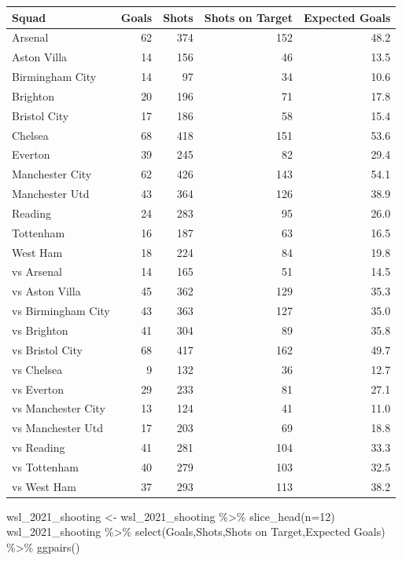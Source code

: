 \documentclass[
  11pt,
]{book}
\newenvironment{Shaded}{\begin{snugshade}}{\end{snugshade}}
\newcommand{\AttributeTok}[1]{\textcolor[rgb]{0.77,0.63,0.00}{#1}}
\newcommand{\DecValTok}[1]{\textcolor[rgb]{0.00,0.00,0.81}{#1}}
\newcommand{\FunctionTok}[1]{\textcolor[rgb]{0.00,0.00,0.00}{#1}}
\newcommand{\NormalTok}[1]{#1}
\newcommand{\OtherTok}[1]{\textcolor[rgb]{0.56,0.35,0.01}{#1}}
\newcommand{\SpecialCharTok}[1]{\textcolor[rgb]{0.00,0.00,0.00}{#1}}
\newcommand{\StringTok}[1]{\textcolor[rgb]{0.31,0.60,0.02}{#1}}
\theoremstyle{definition}
\theoremstyle{definition}
\theoremstyle{definition}
\theoremstyle{definition}
\theoremstyle{remark}
\begin{document}
\begin{table}[H]
\centering
\begin{tabular}{lrrrr}
\toprule
Squad & Goals & Shots & Shots on Target & Expected Goals\\
\midrule
Arsenal & 62 & 374 & 152 & 48.2\\
Aston Villa & 14 & 156 & 46 & 13.5\\
Birmingham City & 14 & 97 & 34 & 10.6\\
Brighton & 20 & 196 & 71 & 17.8\\
Bristol City & 17 & 186 & 58 & 15.4\\
Chelsea & 68 & 418 & 151 & 53.6\\
Everton & 39 & 245 & 82 & 29.4\\
Manchester City & 62 & 426 & 143 & 54.1\\
Manchester Utd & 43 & 364 & 126 & 38.9\\
Reading & 24 & 283 & 95 & 26.0\\
Tottenham & 16 & 187 & 63 & 16.5\\
West Ham & 18 & 224 & 84 & 19.8\\
vs Arsenal & 14 & 165 & 51 & 14.5\\
vs Aston Villa & 45 & 362 & 129 & 35.3\\
vs Birmingham City & 43 & 363 & 127 & 35.0\\
vs Brighton & 41 & 304 & 89 & 35.8\\
vs Bristol City & 68 & 417 & 162 & 49.7\\
vs Chelsea & 9 & 132 & 36 & 12.7\\
vs Everton & 29 & 233 & 81 & 27.1\\
vs Manchester City & 13 & 124 & 41 & 11.0\\
vs Manchester Utd & 17 & 203 & 69 & 18.8\\
vs Reading & 41 & 281 & 104 & 33.3\\
vs Tottenham & 40 & 279 & 103 & 32.5\\
vs West Ham & 37 & 293 & 113 & 38.2\\
\bottomrule
\end{tabular}
\end{table}

\newpage

\begin{Shaded}
\begin{Highlighting}[]
\NormalTok{wsl\_2021\_shooting }\OtherTok{\textless{}{-}}\NormalTok{ wsl\_2021\_shooting }\SpecialCharTok{\%\textgreater{}\%}
  \FunctionTok{slice\_head}\NormalTok{(}\AttributeTok{n=}\DecValTok{12}\NormalTok{)}
\NormalTok{wsl\_2021\_shooting }\SpecialCharTok{\%\textgreater{}\%} 
  \FunctionTok{select}\NormalTok{(Goals,Shots,}\StringTok{\textasciigrave{}}\AttributeTok{Shots on Target}\StringTok{\textasciigrave{}}\NormalTok{,}\StringTok{\textasciigrave{}}\AttributeTok{Expected Goals}\StringTok{\textasciigrave{}}\NormalTok{) }\SpecialCharTok{\%\textgreater{}\%} 
  \FunctionTok{ggpairs}\NormalTok{()}
\end{Highlighting}
\end{Shaded}
\end{document}
